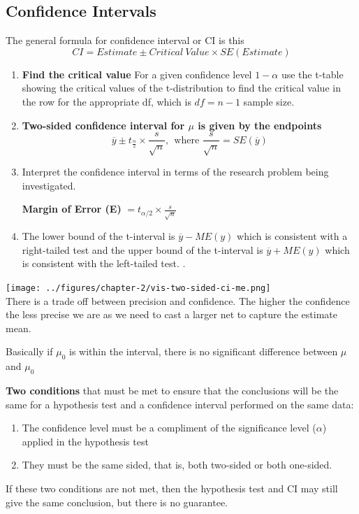 \documentclass[../STAT-252-Notes.tex]{subfiles}
\begin{document}
\subsection{Confidence Intervals }
The general formula for confidence interval or CI is this 
\begin{equation}
  CI = Estimate \pm Critical\ Value \times  SE(Estimate)
\end{equation}
\begin{enumerate}
  \item \textbf{Find the critical value} For a given confidence level $1-\alpha$ use the t-table showing the critical values of the t-distribution to find the critical value in the row for the appropriate df, which is $df = n-1$ sample size.
  \item \textbf{Two-sided confidence interval for $\mu$ is given by the endpoints} 
    \[ 
      \overline{y} \pm t_{\frac{\alpha}{2}} \times \frac{s}{\sqrt{n} },\ \ \text{where } \frac{s}{\sqrt{n} } = SE(\overline{y})
    \] 
  \item Interpret the confidence interval in terms of the research problem being investigated.
    \begin{Note}
      \textbf{Margin of Error (E)} $= t_{\alpha / 2}\times \frac{s}{\sqrt{n} }$  
    \end{Note}
  \item The lower bound of the t-interval is $\overline{y} - ME(y)$ which is consistent with a right-tailed test and the upper bound of the t-interval is $\overline{y} + ME(y)$ which is consistent with the left-tailed test. . 
\end{enumerate}

{\centering
\texttt{[image: ../figures/chapter-2/vis-two-sided-ci-me.png]}~\\}
There is a trade off between precision and confidence. The higher the confidence the less precise we are as we need to cast a larger net to capture the estimate mean.

Basically if $\mu_0$ is within the interval, there is no significant difference between $\mu$ and $\mu_0$

\textbf{Two conditions} that must be met to ensure that the conclusions will be the same for a
hypothesis test and a confidence interval performed on the same data:
\begin{enumerate}
  \item The confidence level must be a compliment of the significance level ($\alpha$) applied in the
hypothesis test
  \item They must be the same sided, that is, both two-sided or both one-sided. 
\end{enumerate}
If these two conditions are not met, then the hypothesis test and CI may still give the same conclusion, but there is no guarantee.
\end{document}
